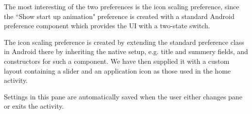 The most interesting of the two preferences is the icon scaling preference, since the ``Show start up animation" preference is created with a standard Android preference component which provides the UI with a two-state switch.

The icon scaling preference is created by extending the standard preference class in Android there by inheriting the native setup, e.g. title and summery fields, and constructors for such a component. We have then supplied it with a custom layout containing a slider and an application icon as those used in the home activity.

Settings in this pane are automatically saved when the user either changes pane or exits the activity.
